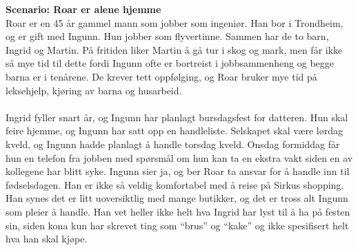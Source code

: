 \noindent\textbf{Scenario: Roar er alene hjemme}\\
Roar er en 45 år gammel mann som jobber som ingeniør. Han bor i Trondheim, og er gift med Ingunn. Hun jobber som flyvertinne. Sammen har de to barn, Ingrid og Martin. På fritiden liker Martin å gå tur i skog og mark, men får ikke så mye tid til dette fordi Ingunn ofte er bortreist i jobbsammenheng og begge barna er i tenårene. De krever tett oppfølging, og Roar bruker mye tid på leksehjelp, kjøring av barna og husarbeid. 
\\\\
Ingrid fyller snart år, og Ingunn har planlagt bursdagsfest for datteren. Hun skal feire hjemme, og Ingunn har satt opp en handleliste. Selskapet skal være lørdag kveld, og Ingunn hadde planlagt å handle torsdag kveld. Onsdag formiddag får hun en telefon fra jobben med spørsmål om hun kan ta en ekstra vakt siden en av kollegene har blitt syke. Ingunn sier ja, og ber Roar ta ansvar for å handle inn til fødselsdagen. Han er ikke så veldig komfortabel med å reise på Sirkus shopping. Han synes det er litt uoversiktlig med mange butikker, og det er tross alt Ingunn som pleier å handle. Han vet heller ikke helt hva Ingrid har lyst til å ha på festen sin, siden kona kun har skrevet ting som “brus” og “kake” og ikke spesifisert helt hva han skal kjøpe.

